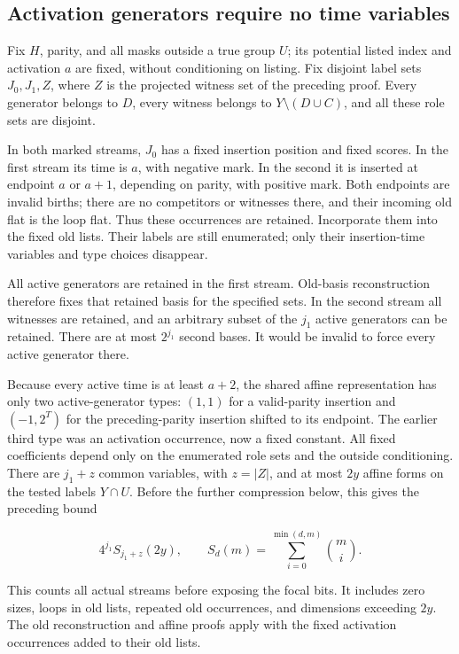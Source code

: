 \documentclass[11pt]{article}
\begin{document}
\subsection{Activation generators require no time variables}\label{activation-generators-require-no-time-variables}

Fix \(H\), parity, and all masks outside a true group \(U\); its potential listed index and activation \(a\) are fixed, without conditioning on listing. Fix disjoint label sets \(J_0,J_1,Z\), where \(Z\) is the projected witness set of the preceding proof. Every generator belongs to \(D\), every witness belongs to \(Y\setminus(D\cup C)\), and all these role sets are disjoint.

In both marked streams, \(J_0\) has a fixed insertion position and fixed scores. In the first stream its time is \(a\), with negative mark. In the second it is inserted at endpoint \(a\) or \(a+1\), depending on parity, with positive mark. Both endpoints are invalid births; there are no competitors or witnesses there, and their incoming old flat is the loop flat. Thus these occurrences are retained. Incorporate them into the fixed old lists. Their labels are still enumerated; only their insertion-time variables and type choices disappear.

All active generators are retained in the first stream. Old-basis reconstruction therefore fixes that retained basis for the specified sets. In the second stream all witnesses are retained, and an arbitrary subset of the \(j_1\) active generators can be retained. There are at most \(2^{j_1}\) second bases. It would be invalid to force every active generator there.

Because every active time is at least \(a+2\), the shared affine representation has only two active-generator types: \((1,1)\) for a valid-parity insertion and \((-1,2^T)\) for the preceding-parity insertion shifted to its endpoint. The earlier third type was an activation occurrence, now a fixed constant. All fixed coefficients depend only on the enumerated role sets and the outside conditioning. There are \(j_1+z\) common variables, with \(z=|Z|\), and at most \(2y\) affine forms on the tested labels \(Y\cap U\). Before the further compression below, this gives the preceding bound

\[4^{j_1}S_{j_1+z}(2y),\qquad
S_d(m)=\sum_{i=0}^{\min(d,m)}\binom mi.\]

This counts all actual streams before exposing the focal bits. It includes zero sizes, loops in old lists, repeated old occurrences, and dimensions exceeding \(2y\). The old reconstruction and affine proofs apply with the fixed activation occurrences added to their old lists.
\end{document}
